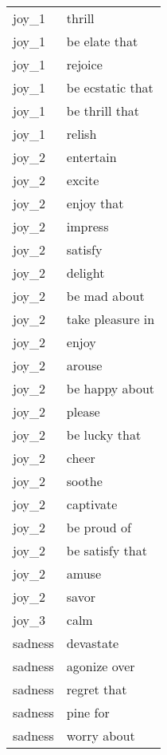 \begin{longtable}{l|l}
joy\_1          & thrill                \\
joy\_1          & be elate that         \\
joy\_1          & rejoice               \\
joy\_1          & be ecstatic that      \\
joy\_1          & be thrill that        \\
joy\_1          & relish                \\
joy\_2          & entertain             \\
joy\_2          & excite                \\
joy\_2          & enjoy that            \\
joy\_2          & impress               \\
joy\_2          & satisfy               \\
joy\_2          & delight               \\
joy\_2          & be mad about          \\
joy\_2          & take pleasure in      \\
joy\_2          & enjoy                 \\
joy\_2          & arouse                \\
joy\_2          & be happy about        \\
joy\_2          & please                \\
joy\_2          & be lucky that         \\
joy\_2          & cheer                 \\
joy\_2          & soothe                \\
joy\_2          & captivate             \\
joy\_2          & be proud of           \\
joy\_2          & be satisfy that       \\
joy\_2          & amuse                 \\
joy\_2          & savor                 \\
joy\_3          & calm                  \\
sadness         & devastate             \\
sadness         & agonize over          \\
sadness         & regret that           \\
sadness         & pine for              \\
sadness         & worry about           \\

\end{longtable}
